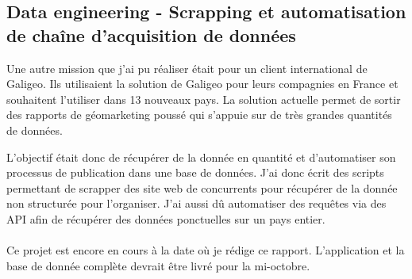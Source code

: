 \subsection{Data engineering - Scrapping et automatisation de chaîne d'acquisition de données}

Une autre mission que j’ai pu réaliser était pour un client international de Galigeo. Ils utilisaient la solution de Galigeo pour leurs compagnies en France et souhaitent l’utiliser dans 13 nouveaux pays. La solution actuelle permet de sortir des rapports de géomarketing poussé qui s’appuie sur de très grandes quantités de données.

L’objectif était donc de récupérer de la donnée en quantité et d’automatiser son processus de publication dans une base de données. J’ai donc écrit des scripts permettant de scrapper des site web de concurrents pour récupérer de la donnée non structurée pour l’organiser. J’ai aussi dû automatiser des requêtes via des API afin de récupérer des données ponctuelles sur un pays entier.

\paragraph*{}

Ce projet est encore en cours à la date où je rédige ce rapport. L’application et la base de donnée complète devrait être livré pour la mi-octobre.
